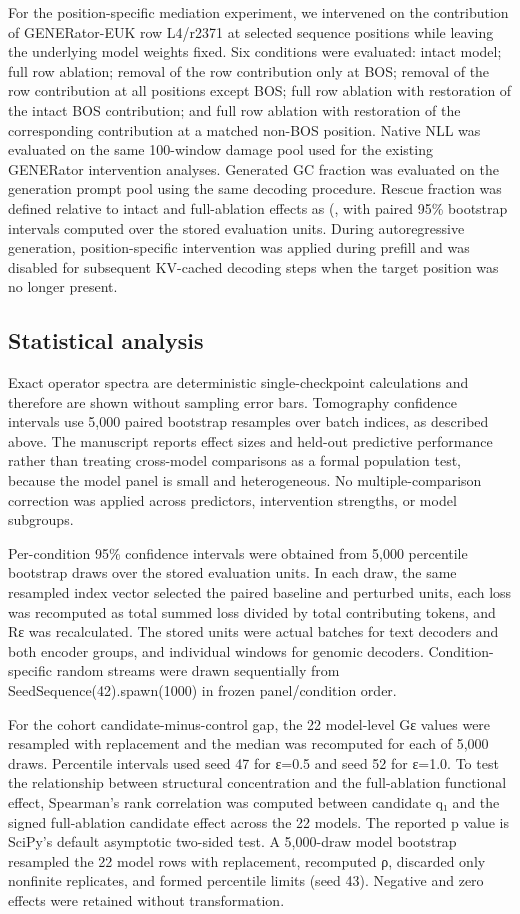 \documentclass[11pt]{article}
\begin{document}
For the position-specific mediation experiment, we intervened on the contribution of GENERator-EUK row L4/r2371 at selected sequence positions while leaving the underlying model weights fixed. Six conditions were evaluated: intact model; full row ablation; removal of the row contribution only at BOS; removal of the row contribution at all positions except BOS; full row ablation with restoration of the intact BOS contribution; and full row ablation with restoration of the corresponding contribution at a matched non-BOS position. Native NLL was evaluated on the same 100-window damage pool used for the existing GENERator intervention analyses. Generated GC fraction was evaluated on the generation prompt pool using the same decoding procedure. Rescue fraction was defined relative to intact and full-ablation effects as (, with paired 95\% bootstrap intervals computed over the stored evaluation units. During autoregressive generation, position-specific intervention was applied during prefill and was disabled for subsequent KV-cached decoding steps when the target position was no longer present.

\subsection*{Statistical analysis}
Exact operator spectra are deterministic single-checkpoint calculations and therefore are shown without sampling error bars. Tomography confidence intervals use 5,000 paired bootstrap resamples over batch indices, as described above. The manuscript reports effect sizes and held-out predictive performance rather than treating cross-model comparisons as a formal population test, because the model panel is small and heterogeneous. No multiple-comparison correction was applied across predictors, intervention strengths, or model subgroups.

Per-condition 95\% confidence intervals were obtained from 5,000 percentile bootstrap draws over the stored evaluation units. In each draw, the same resampled index vector selected the paired baseline and perturbed units, each loss was recomputed as total summed loss divided by total contributing tokens, and Rε was recalculated. The stored units were actual batches for text decoders and both encoder groups, and individual windows for genomic decoders. Condition-specific random streams were drawn sequentially from SeedSequence(42).spawn(1000) in frozen panel/condition order.

For the cohort candidate-minus-control gap, the 22 model-level Gε values were resampled with replacement and the median was recomputed for each of 5,000 draws. Percentile intervals used seed 47 for ε=0.5 and seed 52 for ε=1.0. To test the relationship between structural concentration and the full-ablation functional effect, Spearman's rank correlation was computed between candidate q₁ and the signed full-ablation candidate effect across the 22 models. The reported p value is SciPy's default asymptotic two-sided test. A 5,000-draw model bootstrap resampled the 22 model rows with replacement, recomputed ρ, discarded only nonfinite replicates, and formed percentile limits (seed 43). Negative and zero effects were retained without transformation.
\end{document}
